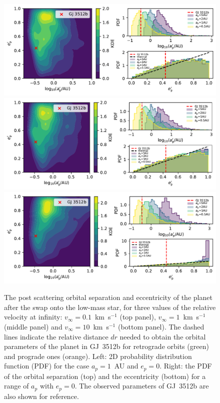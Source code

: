\documentclass[twocolumn]{aastex62}
\begin{document}
\begin{figure}
\includegraphics[width=2\columnwidth]{letter-new-ae-01}\\
\includegraphics[width=2\columnwidth]{letter-new-ae-34}\\
 \includegraphics[width=2\columnwidth]{letter-new-ae-13}
  \caption{The post scattering orbital separation and eccentricity of the planet after the swap onto the low-mass star, for three values of the relative velocity at infinity: $v_\infty=0.1$~km~s$^{-1}$ (top panel), $v_\infty=1$~km~s$^{-1}$ (middle panel) and $v_\infty=10$~km~s$^{-1}$ (bottom panel). 
  The dashed lines indicate the relative distance $dr$ 
  needed to obtain the orbital parameters of the planet in GJ~3512b for retrograde orbits (green) and prograde ones (orange).
  Left: 2D probability distribution function (PDF) for the case $a_p=1$~AU and $e_p=0$. Right: the PDF of the orbital separation (top) and the eccentricity (bottom) for a range of $a_p$ with $e_p=0$. The observed parameters of GJ~3512b are also shown for reference. }
 \label{fig:orbits}
\end{figure}
\end{document}
